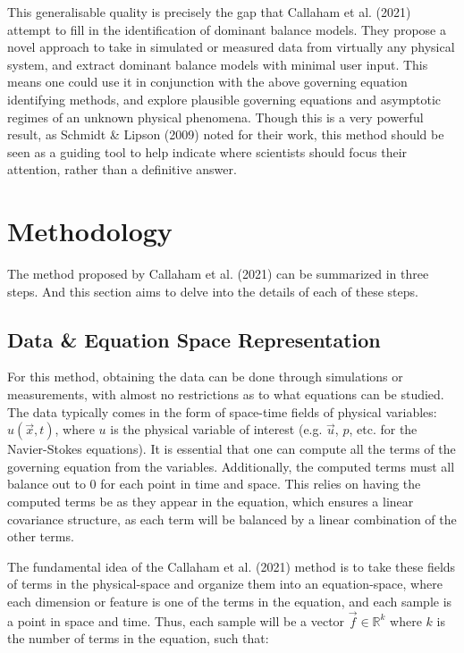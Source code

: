 \documentclass[12pt]{report} %
\begin{document}
\vspace{5mm}

This generalisable quality is precisely the gap that Callaham et al. (2021)\cite{callaham2021learning} attempt to fill in the identification of dominant balance models. They propose a novel approach to take in simulated or measured data from virtually any physical system, and extract dominant balance models with minimal user input. This means one could use it in conjunction with the above governing equation identifying methods, and explore plausible governing equations and asymptotic regimes of an unknown physical phenomena. Though this is a very powerful result, as Schmidt \& Lipson (2009)\cite{schmidt2009distilling} noted for their work, this method should be seen as a guiding tool to help indicate where scientists should focus their attention, rather than a definitive answer.


\chapter{Methodology}

The method proposed by Callaham et al. (2021)\cite{callaham2021learning} can be summarized in three steps. And this section aims to delve into the details of each of these steps.

\section{Data \& Equation Space Representation}

For this method, obtaining the data can be done through simulations or measurements, with almost no restrictions as to what equations can be studied. The data typically comes in the form of space-time fields of physical variables: $u(\vec{x}, t)$, where $u$ is the physical variable of interest (e.g. $\vec{u}$, $p$, etc. for the Navier-Stokes equations). It is essential that one can compute all the terms of the governing equation from the variables. Additionally, the computed terms must all balance out to 0 for each point in time and space. This relies on having the computed terms be as they appear in the equation, which ensures a linear covariance structure, as each term will be balanced by a linear combination of the other terms\cite[Supplementary Information]{callaham2021learning}.

\vspace{5mm}

The fundamental idea of the Callaham et al. (2021) method is to take these fields of terms in the physical-space and organize them into an equation-space, where each dimension or feature is one of the terms in the equation, and each sample is a point in space and time. Thus, each sample will be a vector $\vec{f} \in \mathbb{R}^k$ where $k$ is the number of terms in the equation, such that:
\end{document}
